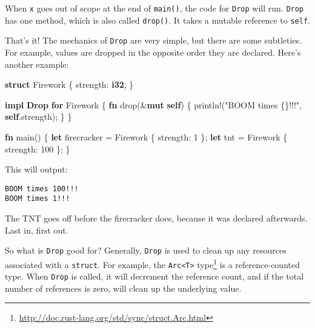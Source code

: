 \documentclass[a4paper,]{book}
\newenvironment{Shaded}{\begin{snugshade}}{\end{snugshade}}
\newcommand{\KeywordTok}[1]{\textcolor[rgb]{0.13,0.29,0.53}{\textbf{{#1}}}}
\newcommand{\DecValTok}[1]{\textcolor[rgb]{0.00,0.00,0.81}{{#1}}}
\newcommand{\StringTok}[1]{\textcolor[rgb]{0.31,0.60,0.02}{{#1}}}
\newcommand{\OtherTok}[1]{\textcolor[rgb]{0.56,0.35,0.01}{{#1}}}
\newcommand{\NormalTok}[1]{{#1}}
\renewcommand{\href}[2]{#2\footnote{\url{#1}}}
\begin{document}
When \texttt{x} goes out of scope at the end of \texttt{main()}, the
code for \texttt{Drop} will run. \texttt{Drop} has one method, which is
also called \texttt{drop()}. It takes a mutable reference to
\texttt{self}.

That's it! The mechanics of \texttt{Drop} are very simple, but there are
some subtleties. For example, values are dropped in the opposite order
they are declared. Here's another example:

\begin{Shaded}
\begin{Highlighting}[]
\KeywordTok{struct} \NormalTok{Firework \{}
    \NormalTok{strength: }\KeywordTok{i32}\NormalTok{,}
\NormalTok{\}}

\KeywordTok{impl} \KeywordTok{Drop} \KeywordTok{for} \NormalTok{Firework \{}
    \KeywordTok{fn} \NormalTok{drop(&}\KeywordTok{mut} \KeywordTok{self}\NormalTok{) \{}
        \OtherTok{println!}\NormalTok{(}\StringTok{"BOOM times \{\}!!!"}\NormalTok{, }\KeywordTok{self}\NormalTok{.strength);}
    \NormalTok{\}}
\NormalTok{\}}

\KeywordTok{fn} \NormalTok{main() \{}
    \KeywordTok{let} \NormalTok{firecracker = Firework \{ strength: }\DecValTok{1} \NormalTok{\};}
    \KeywordTok{let} \NormalTok{tnt = Firework \{ strength: }\DecValTok{100} \NormalTok{\};}
\NormalTok{\}}
\end{Highlighting}
\end{Shaded}

This will output:

\begin{verbatim}
BOOM times 100!!!
BOOM times 1!!!
\end{verbatim}

The TNT goes off before the firecracker does, because it was declared
afterwards. Last in, first out.

So what is \texttt{Drop} good for? Generally, \texttt{Drop} is used to
clean up any resources associated with a \texttt{struct}. For example,
the
\href{http://doc.rust-lang.org/std/sync/struct.Arc.html}{\texttt{Arc\textless{}T\textgreater{}}
type} is a reference-counted type. When \texttt{Drop} is called, it will
decrement the reference count, and if the total number of references is
zero, will clean up the underlying value.

\end{document}
